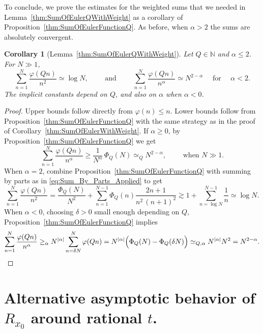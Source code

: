 \documentclass[11pt,reqno]{amsart}
\newtheorem{cor}[thm]{Corollary}
\theoremstyle{definition}
\begin{document}
To conclude, 
we prove the estimates for the weighted sums 
that we needed in Lemma~\ref{thm:SumOfEulerQWithWeight}
as a corollary of Proposition~\ref{thm:SumOfEulerFunctionQ}. 
As before, when $\alpha > 2$ the sums are absolutely convergent. 
\begin{cor}[Lemma~\ref{thm:SumOfEulerQWithWeight}]\label{thm:Appendix_Corollary}
Let $Q \in \mathbb N$ and $\alpha \leq 2$. 
For $N \gg 1$,  
\begin{equation}
\sum_{n=1}^N \frac{\varphi(Qn)}{n^2} \simeq \log N, 
\qquad \text{ and } \qquad 
\sum_{n=1}^N \frac{\varphi(Qn)}{n^\alpha} 
\simeq N^{2 -  \alpha} \quad \text{ for } \quad \alpha < 2.
\end{equation}
The implicit constants depend on $Q$, and also on $\alpha$ when $\alpha < 0$.  
\end{cor}
\begin{proof}
Upper bounds follow directly from $\varphi(n) \leq n$.
Lower bounds follow from Proposition~\ref{thm:SumOfEulerFunctionQ} with the same strategy as in the proof of Corollary~\ref{thm:SumOfEulerWithWeight}. 
If $\alpha \geq 0$, by Proposition~\ref{thm:SumOfEulerFunctionQ} we get
\begin{equation}
\sum_{n=1}^N \frac{\varphi(Qn)}{n^\alpha} 
\geq \frac{1}{N^\alpha}\, \Phi_Q(N) 
\simeq_Q N^{2-\alpha}, \qquad \text{ when } N \gg 1. 
\end{equation}
When $\alpha = 2$, combine 
Proposition~\ref{thm:SumOfEulerFunctionQ} with
summing by parts
as in \eqref{eq:Sum_By_Parts_Applied}
to get 
\begin{equation}
\sum_{n=1}^N \frac{\varphi(Qn)}{n^2} 
 = \frac{\Phi_Q(N)}{N^2} + \sum_{n=1}^{N-1} \Phi_Q(n) \frac{ 2n+1}{n^2 \, (n+1)^2 }
 \gtrsim 1 + \sum_{n=\log N}^{N-1}  \frac{ 1}{n }
 \simeq \log N. 
\end{equation} 
When $\alpha < 0$, choosing $\delta > 0$ small enough depending on $Q$,  
Proposition~\ref{thm:SumOfEulerFunctionQ}  implies
\[
\sum_{n=1}^N \frac{\varphi(Qn)}{n^\alpha} 
\geq_\alpha N^{|\alpha|} \sum_{n=\delta N}^N \varphi(Qn)
= N^{|\alpha|} \Big( \Phi_Q(N) - \Phi_Q(\delta N) \Big) 
\simeq_{Q,\alpha} N^{|\alpha|} N^2 
= N^{2-\alpha}. 
\qedhere
\]
\end{proof}







\section{Alternative asymptotic behavior of $R_{x_0}$ around rational $t$.}
\label{sec:Asymptotic_Alternative}
\end{document}
